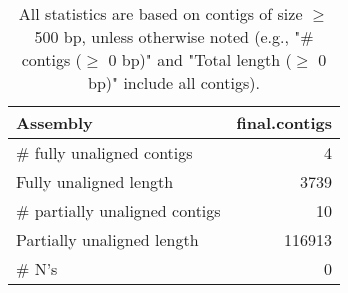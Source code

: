 \documentclass[12pt,a4paper]{article}
\begin{document}
\begin{table}[ht]
\begin{center}
\caption{All statistics are based on contigs of size $\geq$ 500 bp, unless otherwise noted (e.g., "\# contigs ($\geq$ 0 bp)" and "Total length ($\geq$ 0 bp)" include all contigs).}
\begin{tabular}{|l*{1}{|r}|}
\hline
Assembly & final.contigs \\ \hline
\# fully unaligned contigs & 4 \\ \hline
Fully unaligned length & 3739 \\ \hline
\# partially unaligned contigs & 10 \\ \hline
Partially unaligned length & 116913 \\ \hline
\# N's & 0 \\ \hline
\end{tabular}
\end{center}
\end{table}
\end{document}
